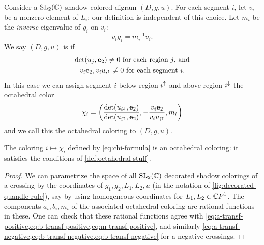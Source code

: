 \documentclass[leqno]{sl2art}
\begin{document}
\begin{definition}
  \label{def:associated-octahedral}
  Consider a \(\operatorname{SL}_2(\mathbb{C})\)-shadow-colored digram \((D, g, u)\).
  For each segment \(i\), let \(v_i\) be a nonzero element of \(L_i\); our definition is independent of this choice.
  Let \(m_i\) be the \emph{inverse}%
  eigenvalue of \(g_i\) on \(v_i\):
   \[
     v_i g_i = m_{i}^{-1} v_{i}.
  \]
  We say \((D, g, u)\) is   if 
  \begin{gather*}
    \det( u_{j}, \mathrm{\mathbf{e}}_{2} ) \ne 0 \text{ for each region \(j\), and}
    \\
    v_i \mathrm{\mathbf{e}}_{2}, v_i u_{i^{\uparrow}} \ne 0 \text{ for each segment \(i\).}
  \end{gather*}
  In this case we can assign segment \(i\) below region \(i^{\uparrow}\) and above region \(i^{\downarrow}\) the octahedral color
  \begin{equation}
    \label{eq:chi-formula}
    \chi_i =
    \left(
      \frac{
        \det( u_{i^{\downarrow}} , \mathrm{\mathbf{e}}_{2} )
        }{
        \det( u_{i^{\uparrow}} , \mathrm{\mathbf{e}}_{2} )
      }
      ,
      -
      \frac{
        v_i \mathrm{\mathbf{e}}_{2}
      }{
        v_i u_{i^{\uparrow}}
      }
      ,
      m_i
    \right)
  \end{equation}
  and we call this the octahedral coloring  to \((D, g, u)\).
\end{definition}

\begin{theorem}
  The coloring \(i \mapsto \chi_i\) defined by \eqref{eq:chi-formula} is an octahedral coloring: it satisfies the conditions of \cref{def:octahedral-stuff}.
\end{theorem}

\begin{proof}
  We can parametrize the space of all \(\operatorname{SL}_2(\mathbb{C})\) decorated shadow colorings of a crossing by the coordinates of \(g_1, g_2, L_1, L_2, u\) (in the notation of \cref{fig:decorated-quandle-rule}), say by using homogeneous coordinates for \(L_1, L_2 \in \psp\).
  The components \(a_i, b_i, m_i\) of the associated octahedral coloring are rational functions in these.
  One can check that these rational functions agree with \cref{eq:a-transf-positive,eq:b-transf-positive,eq:m-transf-positive}, and similarly \cref{eq:a-transf-negative,eq:b-transf-negative,eq:b-transf-negative} for a negative crossings.
\end{proof}
\end{document}

